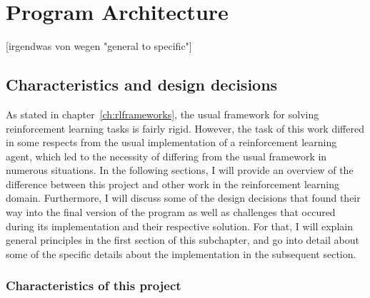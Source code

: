 \chapter{Program Architecture}

\label{ch:program}

\newcommand{\term}[1] {{\spaceskip=.95\fontdimen2\font minus \fontdimen4\font
	\xspaceskip=0pt\relax \large\texttt{#1}}}


[irgendwas von wegen "general to specific"] 


\section{Characteristics and design decisions}

As stated in chapter~\ref{ch:rlframeworks}, the usual framework for solving reinforcement learning tasks is fairly rigid. However, the task of this work differed in some respects from the usual implementation of a reinforcement learning agent, which led to the necessity of differing from the usual framework in numerous situations. In the following sections, I will provide an overview of the difference between this project and other work in the reinforcement learning domain. Furthermore, I will discuss some of the design decisions that found their way into the final version of the program as well as challenges that occured during its implementation and their respective solution. For that, I will explain general principles in the first section of this subchapter, and go into detail about some of the specific details about the implementation in the subsequent section.

\subsection{Characteristics of this project} \label{ch:projectcharacteristics}

